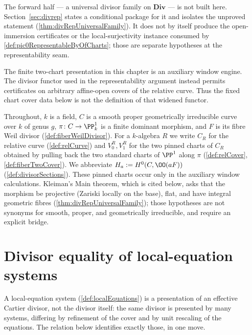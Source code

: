 The forward half --- a universal divisor family on \(\mathbf{Div}\) --- is not built here.
Section~\ref{sec:divrep} states a conditional package for it and isolates the unproved
statement (\ref{thm:divRepUniversalFamily}).  It does not by itself produce the
open-immersion certificates or the local-surjectivity instance consumed by
\ref{def:pic0RepresentableByOfCharts}; those are separate hypotheses at the representability
seam.

The finite two-chart presentation in this chapter is an auxiliary window engine.  The divisor
functor used in the representability argument instead permits certificates on arbitrary
affine-open covers of the relative curve.  Thus the fixed chart cover data below is not the
definition of that widened functor.

Throughout, \(k\) is a field, \(C\) is a smooth proper geometrically irreducible curve over
\(k\) of genus \(g\), \(\pi \colon C \to \PP^1_k\) is a finite dominant morphism, and
\(F\) is its fibre Weil divisor (\ref{def:fiberWeilDivisor}). For a \(k\)-algebra \(R\) we
write \(C_R\) for the relative curve (\ref{def:relCurve}) and \(V_0^R, V_1^R\) for the two
pinned charts of \(C_R\) obtained by pulling back the two standard charts of \(\PP^1\)
along \(\pi\) (\ref{def:relCover}, \ref{def:fiberTwoCover}). We abbreviate
\(H_a := H^0(C, \OO(aF))\) (\ref{def:divisorSections}).  These pinned charts occur only
in the auxiliary window calculations.  Kleiman's Main theorem, which is cited below, asks
that the morphism be projective (Zariski locally on the base), flat, and have integral
geometric fibres (\ref{thm:divRepUniversalFamily}); those hypotheses are not synonyms for
smooth, proper, and geometrically irreducible, and require an explicit bridge.

\section{Divisor equality of local-equation systems}
\label{sec:diveq}

A local-equation system (\ref{def:localEquations}) is a presentation of an effective
Cartier divisor, not the divisor itself: the same divisor is presented by many systems,
differing by refinement of the cover and by unit rescaling of the equations. The relation
below identifies exactly those, in one move.


